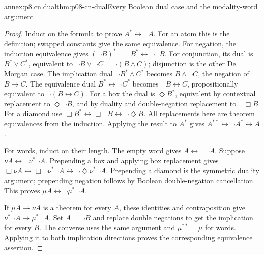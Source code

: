 \begin{annexitem}{annex:p8.cn.dual}{thm:p08-cn-dual}{Every Boolean dual case and the modality-word argument}
\begin{proof}
Induct on the formula to prove \(A^*\leftrightarrow\neg A\).
For an atom this is the definition; swapped constants give the
same equivalence. For negation, the induction equivalence gives
\((\neg B)^*=\neg B^*\leftrightarrow\neg\neg B\).
For conjunction, its dual is \(B^*\lor C^*\), equivalent to
\(\neg B\lor\neg C=\neg(B\land C)\); disjunction is
the other De Morgan case. The implication dual
\(\neg B^*\land C^*\) becomes \(B\land\neg C\),
the negation of \(B\to C\). The equivalence dual
\(B^*\leftrightarrow\neg C^*\) becomes
\(\neg B\leftrightarrow C\), propositionally equivalent
to \(\neg(B\leftrightarrow C)\).
For a box the dual is \(\Diamond B^*\), equivalent by
contextual replacement to \(\Diamond\neg B\), and by
duality and double-negation replacement to \(\neg\Box B\).
For a diamond use \(\Box B^*\leftrightarrow\Box\neg B
\leftrightarrow\neg\Diamond B\).
All replacements here are theorem equivalences from the induction.
Applying the result to \(A^*\) gives
\(A^{**}\leftrightarrow\neg A^*\leftrightarrow A\).

For words, induct on their length. The empty word gives
\(A\leftrightarrow\neg\neg A\). Suppose
\(\nu A\leftrightarrow\neg\nu^*\neg A\).
Prepending a box and applying box replacement gives
\(\Box\nu A\leftrightarrow\Box\neg\nu^*\neg A
\leftrightarrow\neg\Diamond\nu^*\neg A\).
Prepending a diamond is the symmetric duality argument; prepending
negation follows by Boolean double-negation cancellation.
This proves \(\mu A\leftrightarrow\neg\mu^*\neg A\).

If \(\mu A\to\nu A\) is a theorem for every \(A\),
these identities and contraposition give
\(\nu^*\neg A\to\mu^*\neg A\). Set \(A=\neg B\)
and replace double negations to get the implication for every \(B\).
The converse uses the same argument and \(\mu^{**}=\mu\)
for words. Applying it to both implication directions proves
the corresponding equivalence assertion.
\end{proof}
\end{annexitem}


